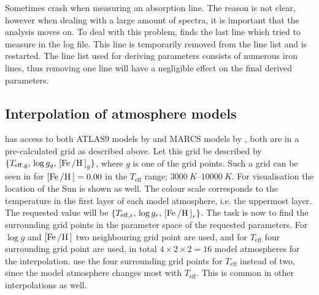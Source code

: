 Sometimes \ARES crash when measuring an absorption line. The reason is not
clear, however when dealing with a large amount of spectra, it is important that
the analysis moves on. To deal with this problem, \FASMA finds the last line
which \ARES tried to measure in the log file. This line is temporarily removed
from the line list and \ARES is restarted. The line list used for deriving
parameters consists of numerous iron lines, thus removing one line will have a
negligible effect on the final derived parameters.



\subsection{Interpolation of atmosphere models}
\label{sec:interpolation}

\FASMA has access to both ATLAS9 models by \citet{Kurucz1993} and MARCS models
by \citet{Gustafson2008}, both are in a pre-calculated grid as described above.
Let this grid be described by $\{T_\mathrm{eff,g},\,\log
g_g,\,[\ion{Fe}/\ion{H}]_g\}$, where $g$ is one of the grid points. Such a grid
can be seen in  for $[\ion{Fe}/\ion{H}]=0.00$ in the
$T_\mathrm{eff}$ range; $\SIrange{3000}{10000}{K}$. For visualisation the
location of the Sun is shown as well. The colour scale corresponds to the
temperature in the first layer of each model atmosphere, i.e. the uppermost
layer. The requested value will be $\{T_\mathrm{eff,r},\,\log
g_r,\,[\ion{Fe}/\ion{H}]_r\}$. The task is now to find the surrounding grid
points in the parameter space of the requested parameters. For $\log g$ and
$[\ion{Fe}/\ion{H}]$ two neighbouring grid point are used, and for
$T_\mathrm{eff}$ four surrounding grid point are used, in total
$4\times2\times2=16$ model atmospheres for the interpolation. \FASMA use the
four surrounding grid points for $T_\mathrm{eff}$ instead of two, since the
model atmosphere changes most with $T_\mathrm{eff}$. This is common in other
interpolations as well.

